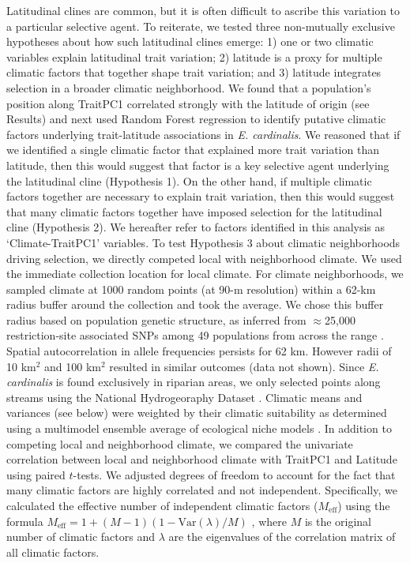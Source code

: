 \documentclass[11pt, oneside]{article}
\begin{document}
Latitudinal clines are common, but it is often difficult to ascribe this variation to a particular selective agent. To reiterate, we tested three non-mutually exclusive hypotheses about how such latitudinal clines emerge: 1) one or two climatic variables explain latitudinal trait variation; 2) latitude is a proxy for multiple climatic factors that together shape trait variation; and 3) latitude integrates selection in a broader climatic neighborhood. We found that a population's position along TraitPC1 correlated strongly with the latitude of origin (see Results) and next used Random Forest regression \citep{Liaw_Wiener_2002} to identify putative climatic factors underlying trait-latitude associations in \textit{E. cardinalis}. We reasoned that if we identified a single climatic factor that explained more trait variation than latitude, then this would suggest that factor is a key selective agent underlying the latitudinal cline (Hypothesis 1). On the other hand, if multiple climatic factors together are necessary to explain trait variation, then this would suggest that many climatic factors together have imposed selection for the latitudinal cline (Hypothesis 2). We hereafter refer to factors identified in this analysis as `Climate-TraitPC1' variables. To test Hypothesis 3 about climatic neighborhoods driving selection, we directly competed local with neighborhood climate. We used the immediate collection location for local climate. For climate neighborhoods, we sampled climate at 1000 random points (at 90-m resolution) within a 62-km radius buffer around the collection and took the average. We chose this buffer radius based on population genetic structure, as inferred from $\approx$25,000 restriction-site associated SNPs among 49 populations from across the range \citep{Paul_etal_2016}. Spatial autocorrelation in allele frequencies persists for 62 km. However radii of 10 km$^2$ and 100 km$^2$ resulted in similar outcomes (data not shown). Since \textit{E. cardinalis} is found exclusively in riparian areas, we only selected points along streams using the National Hydrogeoraphy Dataset \citep{NHD}. Climatic means and variances (see below) were weighted by their climatic suitability as determined using a multimodel ensemble average of ecological niche models \citep{Angert_ENM}. In addition to competing local and neighborhood climate, we compared the univariate correlation between local and neighborhood climate with TraitPC1 and Latitude using paired $t$-tests. We adjusted degrees of freedom to account for the fact that many climatic factors are highly correlated and not independent. Specifically, we calculated the effective number of independent climatic factors ($M_\text{eff}$) using the formula $M_\text{eff} = 1 + (M - 1) (1 - \text{Var}(\lambda) / M)$ \citep{Chevrud_2001}, where $M$ is the original number of climatic factors and $\lambda$ are the eigenvalues of the correlation matrix of all climatic factors. 
\end{document}
